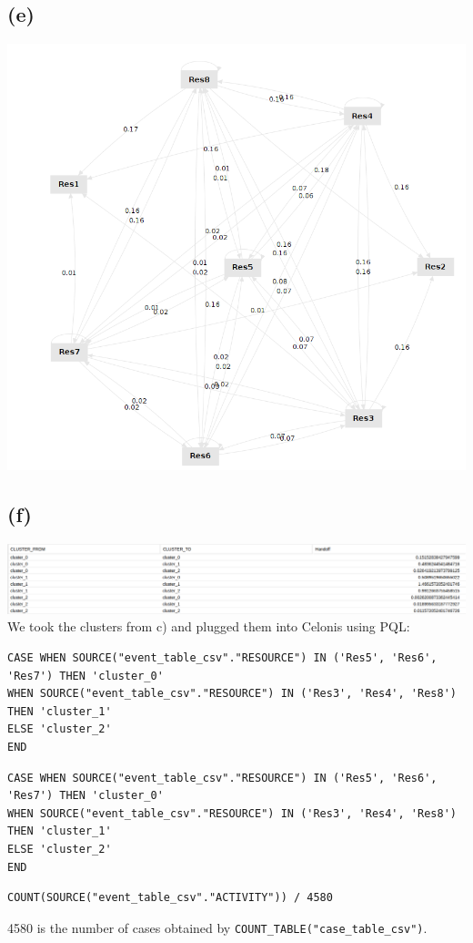 \documentclass[../../main.tex]{subfiles}
\begin{document}
\subsection*{(e)}

\includegraphics[width=0.7\columnwidth]{img/RapidMiner_e_Graph.png}

\subsection*{(f)}
\includegraphics[width=\columnwidth]{img/Celonis_f_OLAP.png}\\
We took the clusters from c) and plugged them into Celonis using PQL:
\begin{lstlisting}
CASE WHEN SOURCE("event_table_csv"."RESOURCE") IN ('Res5', 'Res6', 'Res7') THEN 'cluster_0'
WHEN SOURCE("event_table_csv"."RESOURCE") IN ('Res3', 'Res4', 'Res8') THEN 'cluster_1'
ELSE 'cluster_2'
END
\end{lstlisting}
\begin{lstlisting}
CASE WHEN SOURCE("event_table_csv"."RESOURCE") IN ('Res5', 'Res6', 'Res7') THEN 'cluster_0'
WHEN SOURCE("event_table_csv"."RESOURCE") IN ('Res3', 'Res4', 'Res8') THEN 'cluster_1'
ELSE 'cluster_2'
END
\end{lstlisting}
\begin{lstlisting}
COUNT(SOURCE("event_table_csv"."ACTIVITY")) / 4580
\end{lstlisting}
4580 is the number of cases obtained by \verb|COUNT_TABLE("case_table_csv")|.
\end{document}
